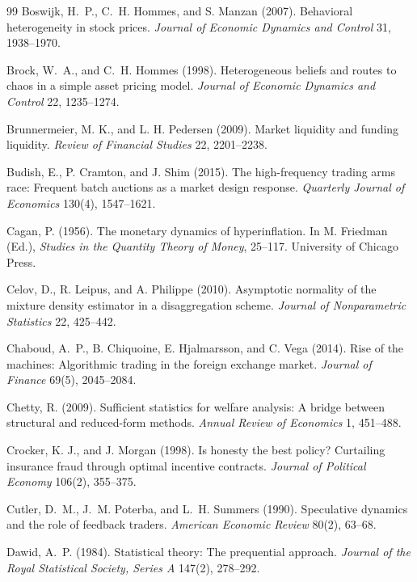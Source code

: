 \documentclass[12pt]{article}
\theoremstyle{definition}
\theoremstyle{remark}
\begin{document}
\begin{thebibliography}{99}
 Boswijk, H.~P., C.~H. Hommes, and S. Manzan (2007). Behavioral heterogeneity in stock prices. \emph{Journal of Economic Dynamics and Control} 31, 1938--1970.

 Brock, W.~A., and C.~H. Hommes (1998). Heterogeneous beliefs and routes to chaos in a simple asset pricing model. \emph{Journal of Economic Dynamics and Control} 22, 1235--1274.

 Brunnermeier, M. K., and L. H. Pedersen (2009). Market liquidity and funding liquidity. \emph{Review of Financial Studies} 22, 2201--2238.

 Budish, E., P. Cramton, and J. Shim (2015). The high-frequency trading arms race: Frequent batch auctions as a market design response. \emph{Quarterly Journal of Economics} 130(4), 1547--1621.

 Cagan, P. (1956). The monetary dynamics of hyperinflation. In M. Friedman (Ed.), \emph{Studies in the Quantity Theory of Money}, 25--117. University of Chicago Press.

 Celov, D., R. Leipus, and A. Philippe (2010). Asymptotic normality of the mixture density estimator in a disaggregation scheme. \emph{Journal of Nonparametric Statistics} 22, 425--442.

 Chaboud, A.~P., B. Chiquoine, E. Hjalmarsson, and C. Vega (2014). Rise of the machines: Algorithmic trading in the foreign exchange market. \emph{Journal of Finance} 69(5), 2045--2084.

 Chetty, R. (2009). Sufficient statistics for welfare analysis: A bridge between structural and reduced-form methods. \emph{Annual Review of Economics} 1, 451--488.

 Crocker, K. J., and J. Morgan (1998). Is honesty the best policy? Curtailing insurance fraud through optimal incentive contracts. \emph{Journal of Political Economy} 106(2), 355--375.

 Cutler, D.~M., J.~M. Poterba, and L.~H. Summers (1990). Speculative dynamics and the role of feedback traders. \emph{American Economic Review} 80(2), 63--68.

 Dawid, A.~P. (1984). Statistical theory: The prequential approach. \emph{Journal of the Royal Statistical Society, Series A} 147(2), 278--292.


\end{thebibliography}
\end{document}
